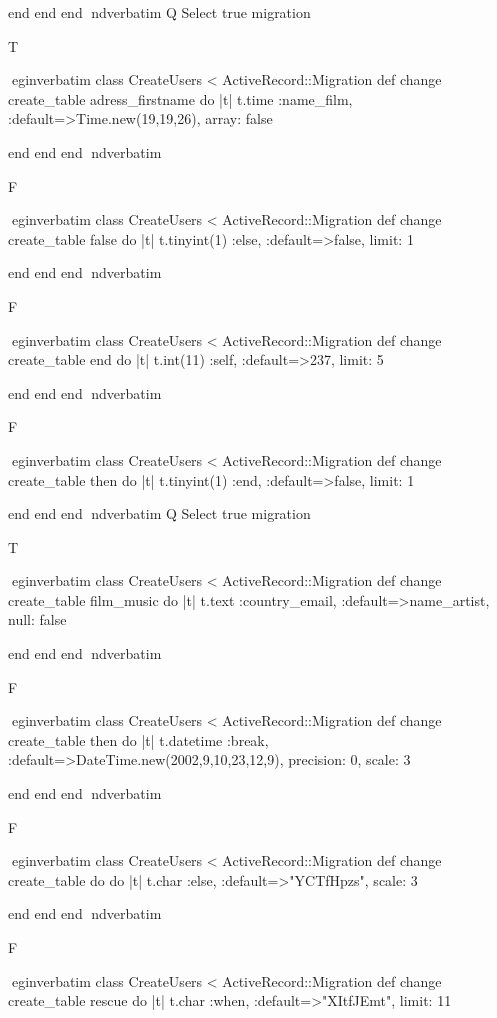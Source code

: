     end 
  end 
end
nd{verbatim}
Q
 Select true migration

T

egin{verbatim}
 class CreateUsers < ActiveRecord::Migration 
  def change 
    create_table adress_firstname do |t| 
      t.time :name_film, :default=>Time.new(19,19,26), array: false
    
    end 
  end 
end
nd{verbatim}

F

egin{verbatim}
 class CreateUsers < ActiveRecord::Migration 
  def change 
    create_table false do |t| 
      t.tinyint(1) :else, :default=>false, limit: 1
    
    end 
  end 
end
nd{verbatim}

F

egin{verbatim}
 class CreateUsers < ActiveRecord::Migration 
  def change 
    create_table end do |t| 
      t.int(11) :self, :default=>237, limit: 5
    
    end 
  end 
end
nd{verbatim}

F

egin{verbatim}
 class CreateUsers < ActiveRecord::Migration 
  def change 
    create_table then do |t| 
      t.tinyint(1) :end, :default=>false, limit: 1
    
    end 
  end 
end
nd{verbatim}
Q
 Select true migration

T

egin{verbatim}
 class CreateUsers < ActiveRecord::Migration 
  def change 
    create_table film_music do |t| 
      t.text :country_email, :default=>name_artist, null: false
    
    end 
  end 
end
nd{verbatim}

F

egin{verbatim}
 class CreateUsers < ActiveRecord::Migration 
  def change 
    create_table then do |t| 
      t.datetime :break, :default=>DateTime.new(2002,9,10,23,12,9), precision: 0, scale: 3
    
    end 
  end 
end
nd{verbatim}

F

egin{verbatim}
 class CreateUsers < ActiveRecord::Migration 
  def change 
    create_table do do |t| 
      t.char :else, :default=>"YCTfHpzs", scale: 3
    
    end 
  end 
end
nd{verbatim}

F

egin{verbatim}
 class CreateUsers < ActiveRecord::Migration 
  def change 
    create_table rescue do |t| 
      t.char :when, :default=>"XItfJEmt", limit: 11
    
